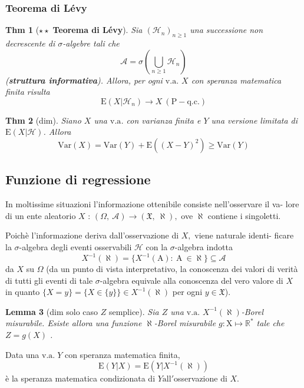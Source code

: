 \documentclass[a4paper,11pt]{article}
\theoremstyle{plain}
\newtheorem{thm}{Thm}[section]
\newtheorem{lem}[thm]{Lemma}
\theoremstyle{definition}
\theoremstyle{remark}
\begin{document}
\subsubsection{Teorema di Lévy}
\begin{thm}[$\star \star $ \textbf{Teorema di Lévy}]
Sia $(\mathcal{H}_{n})_{n\geq 1}$ una successione non decrescente di $\sigma$-algebre tali che
$$
\mathcal{A}=\sigma(\bigcup_{n\geq 1}\mathcal{H}_{n})
$$
(\textbf{struttura informativa}). Allora, per ogni $\mathrm{v}.\mathrm{a}.$ $X$ con speranza matematica finita risulta
$$
\mathrm{E}(X|\mathcal{H}_{n})\rightarrow X\ (\mathrm{P}- \mathrm{q}.\mathrm{c}.)
$$
\end{thm}

\begin{thm}[dim]
Siano $X$ una $\mathrm{v}.\mathrm{a}$. con varianza finita  e $Y$ una versione limitata di $\mathrm{E}(X|\mathcal{H})$. Allora
$$
\mathrm{V}\mathrm{a}\mathrm{r} (X)=\mathrm{V}\mathrm{a}\mathrm{r}(Y)+\mathrm{E}((X-Y)^{2})\geq \mathrm{V}\mathrm{a}\mathrm{r}(Y)
$$
\end{thm}

\subsection{Funzione di regressione}
In moltissime situazioni l'informazione ottenibile consiste nell'osservare il va- lore di un ente aleatorio $X$ : $(\Omega,\ \mathcal{A})\rightarrow(\mathfrak{X},\ \aleph),$ ove $ \aleph$ contiene $\mathrm{i}$ singoletti.

\noindent
Poichè l'informazione deriva dall'osservazione di $X,$ viene naturale identi- ficare la $\sigma$-algebra degli eventi osservabili $\mathcal{H}$ con la $\sigma$-algebra indotta
$$
X^{-1}(\aleph)=\{X^{-1}(\mathrm{A}):\ \mathrm{A}\ \in\aleph\}\subseteq \mathcal{A}
$$
da $X$ su $\Omega$ (da un punto di vista interpretativo, la conoscenza dei valori di verità di tutti gli eventi di tale $\sigma$-algebra equivale alla conoscenza del vero valore di $X$ in quanto $\{X=y\}=\{X\in\{y\}\}\in X^{-1}(\aleph)$ per ogni $y\in \mathfrak{X}$).


\begin{lem}[dim solo caso $Z$ semplice] Sia $Z$ una $\mathrm{v}.\mathrm{a}.$ $X^{-1}(\aleph)$-Borel misurabile. Esiste allora una funzione $\aleph$-Borel misurabile $g:\mathrm{X}\mapsto \mathbb{R}^{*}$ tale che $Z=g(X)$ .
\end{lem}

\noindent
Data una $\mathrm{v}.\mathrm{a}. \; Y$ con speranza matematica finita,
$$
\mathrm{E}(Y|X)=\mathrm{E}(Y|X^{-1}(\aleph))
$$
è la speranza matematica condizionata di $Y\mathrm{a}\mathrm{l}\mathrm{l}'$osservazione di $X.$
\end{document}
